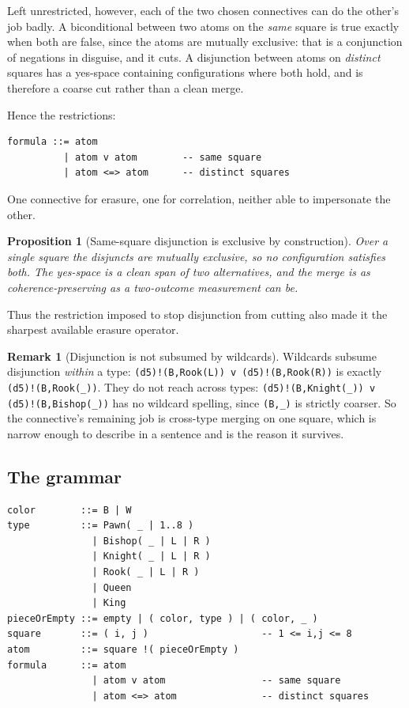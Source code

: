 \documentclass[11pt,a4paper]{article}
\theoremstyle{definition}
\newtheorem{remark}[definition]{Remark}
\theoremstyle{plain}
\newtheorem{proposition}[definition]{Proposition}
\begin{document}
Left unrestricted, however, each of the two chosen connectives can do the
other's job badly. A biconditional between two atoms on the \emph{same} square
is true exactly when both are false, since the atoms are mutually exclusive:
that is a conjunction of negations in disguise, and it cuts. A disjunction
between atoms on \emph{distinct} squares has a yes-space containing
configurations where both hold, and is therefore a coarse cut rather than a
clean merge.

Hence the restrictions:

\begin{lstlisting}
formula ::= atom
          | atom v atom        -- same square
          | atom <=> atom      -- distinct squares
\end{lstlisting}

One connective for erasure, one for correlation, neither able to impersonate
the other.

\begin{proposition}[Same-square disjunction is exclusive by construction]
Over a single square the disjuncts are mutually exclusive, so no configuration
satisfies both. The yes-space is a clean span of two alternatives, and the
merge is as coherence-preserving as a two-outcome measurement can be.
\end{proposition}

Thus the restriction imposed to stop disjunction from cutting also made it the
sharpest available erasure operator.

\begin{remark}[Disjunction is not subsumed by wildcards]
Wildcards subsume disjunction \emph{within} a type:
\texttt{(d5)!(B,Rook(L)) v (d5)!(B,Rook(R))} is exactly
\texttt{(d5)!(B,Rook(\_))}. They do not reach across types:
\texttt{(d5)!(B,Knight(\_)) v (d5)!(B,Bishop(\_))} has no wildcard spelling,
since \texttt{(B,\_)} is strictly coarser. So the connective's remaining job is
cross-type merging on one square, which is narrow enough to describe in a
sentence and is the reason it survives.
\end{remark}

\subsection{The grammar}

\begin{lstlisting}
color        ::= B | W
type         ::= Pawn( _ | 1..8 )
               | Bishop( _ | L | R )
               | Knight( _ | L | R )
               | Rook( _ | L | R )
               | Queen
               | King
pieceOrEmpty ::= empty | ( color, type ) | ( color, _ )
square       ::= ( i, j )                    -- 1 <= i,j <= 8
atom         ::= square !( pieceOrEmpty )
formula      ::= atom
               | atom v atom                 -- same square
               | atom <=> atom               -- distinct squares
\end{lstlisting}
\end{document}
